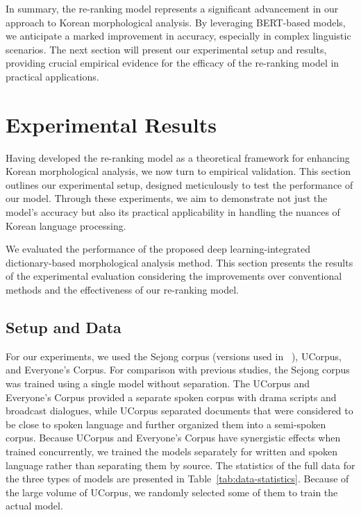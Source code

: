 \documentclass[AMS,STIX2COL]{WileyNJD-v2}
\begin{document}
    In summary, the re-ranking model represents a significant advancement in our approach to Korean morphological analysis.
    By leveraging BERT-based models, we anticipate a marked improvement in accuracy, especially in complex linguistic scenarios.
    The next section will present our experimental setup and results, providing crucial empirical evidence for the efficacy of the re-ranking model in practical applications.


    \section{Experimental Results}\label{sec:results}

    Having developed the re-ranking model as a theoretical framework for enhancing Korean morphological analysis, we now turn to empirical validation.
    This section outlines our experimental setup, designed meticulously to test the performance of our model.
    Through these experiments, we aim to demonstrate not just the model's accuracy but also its practical applicability in handling the nuances of Korean language processing.

    We evaluated the performance of the proposed deep learning-integrated dictionary-based morphological analysis method.
    This section presents the results of the experimental evaluation considering the improvements over conventional methods and the effectiveness of our re-ranking model.

    \subsection{Setup and Data}\label{subsec:setup-and-data}

    For our experiments, we used the Sejong corpus (versions used in ~\cite{NaSH2014, NaSH2015, NaSH2018, SongHJ2019, SongHJ2020}), UCorpus\cite{UCorpusHG}, and Everyone's Corpus\cite{EveryoneCorpus}.
    For comparison with previous studies, the Sejong corpus was trained using a single model without separation.
    The UCorpus and Everyone's Corpus provided a separate spoken corpus with drama scripts and broadcast dialogues, while UCorpus separated documents that were considered to be close to spoken language and further organized them into a semi-spoken corpus.
    Because UCorpus and Everyone's Corpus have synergistic effects when trained concurrently, we trained the models separately for written and spoken language rather than separating them by source.
    The statistics of the full data for the three types of models are presented in Table~\ref{tab:data-statistics}.
    Because of the large volume of UCorpus, we randomly selected some of them to train the actual model.
\end{document}
